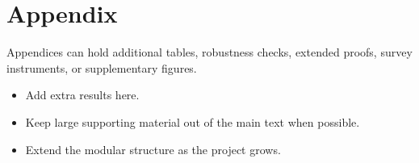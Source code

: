 \section{Appendix}

Appendices can hold additional tables, robustness checks, extended proofs, survey instruments, or supplementary figures.

\begin{itemize}
  \item Add extra results here.
  \item Keep large supporting material out of the main text when possible.
  \item Extend the modular structure as the project grows.
\end{itemize}
